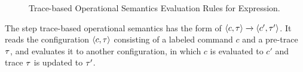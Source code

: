 \begin{figure}
 \caption{Trace-based Operational Semantics Evaluation Rules for Expression.}
 \label{fig:expr_eval}
\end{figure}
%
%
The step trace-based operational semantics has the form of $ \langle c, \mathtt{\tau} \rangle \xrightarrow{} { \langle c', \mathtt{\tau}' \rangle}$. 
It reads the configuration $\langle c, \mathtt{\tau} \rangle$ consisting of a labeled command $c$ and a pre-trace $\mathtt{\tau}$, 
and evaluates it to another configuration, 
in which $c$ is evaluated to $c'$ and trace $\mathtt{\tau}$ is updated to $\mathtt{\tau}'$. 

